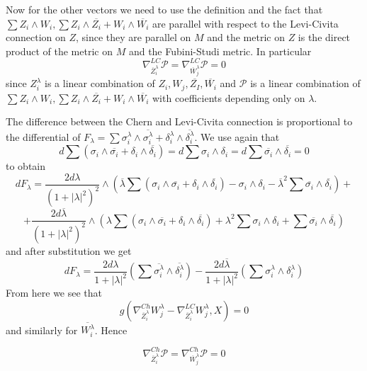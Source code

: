 \documentclass[11pt,oneside,leqno]{amsart}
\theoremstyle{plain}
\theoremstyle{definition}
\begin{document}
Now for the other vectors we need to use the definition and the fact that $\sum Z_i\wedge W_i, \sum Z_i\wedge \overline{Z_i}+W_i\wedge \overline{W_i}$ are parallel with respect to the Levi-Civita connection on $Z$, since they are parallel on $M$ and the metric on $Z$ is the direct product of the metric on $M$ and the Fubini-Studi metric. In particular
\begin{equation}
\nabla^{LC}_{\overline{Z}_i^{\lambda}} \mathcal{P} =\nabla^{LC}_{\overline{W}_j^{\lambda}} \mathcal{P} = 0
\end{equation}
since $Z_i^{\lambda}$ is a linear combination of $Z_i,W_j,\overline{Z_I},\overline{W_i}$ and $\mathcal{P}$ is a linear combination of $\sum Z_i\wedge W_i, \sum Z_i\wedge \overline{Z_i}+W_i\wedge \overline{W_i}$ with coefficients depending only on $\lambda$.

The difference between the Chern and Levi-Civita connection is proportional to the differential of $F_{\lambda} = \sum \sigma_i^{\lambda}\wedge\overline{\sigma_i^{\lambda}}+\delta_i^{\lambda}\wedge\overline{\delta_i^{\lambda}}$.
We use again that $$d\sum(\sigma_i\wedge\overline{\sigma_i}+\delta_i\wedge\overline{\delta_i}) = d\sum\sigma_i\wedge\delta_i = d \sum \overline{\sigma_i}\wedge\overline{\delta_i} = 0$$
to obtain
$$
dF_{\lambda} = \frac{2d\lambda}{(1+|\lambda|^2)^2}\wedge\left( \overline{\lambda}\sum(\sigma_i\wedge\overline{\sigma_i}+\delta_i\wedge\overline{\delta_i}) - \sigma_i\wedge\delta_i - \overline{\lambda}^2\sum \overline{\sigma_i}\wedge\overline{\delta_i}\right) +$$
$$
+\frac{2d\overline{\lambda}}{(1+|\lambda|^2)^2}\wedge\left(\lambda\sum(\sigma_i\wedge\overline{\sigma_i}+\delta_i\wedge\overline{\delta_i}) + {\lambda}^2\sum\sigma_i\wedge\delta_i +\sum \overline{\sigma_i}\wedge\overline{\delta_i}\right)
$$
and after substitution we get
\begin{equation}
dF_{\lambda} = \frac{2d\lambda}{1+|\lambda|^2}\left(\sum\overline{\sigma_i^{\lambda}}\wedge\overline{\delta_i^{\lambda}}\right)-\frac{2d\overline{\lambda}}{1+|\lambda|^2}
\left(\sum\sigma_i^{\lambda}\wedge\delta_i^{\lambda}\right)
\end{equation}
From here we see that
\begin{equation}
g(\nabla^{Ch}_{\overline{Z}_i^{\lambda}}W_j^{\lambda}-\nabla^{LC}_{\overline{Z}_i^{\lambda}}W_j^{\lambda}, X) = 0
\end{equation}
and similarly for $\overline{W_i^{\lambda}}$. Hence

\begin{equation}
\nabla^{Ch}_{\overline{Z}_i^{\lambda}} \mathcal{P} =\nabla^{Ch}_{\overline{W}_j^{\lambda}} \mathcal{P} = 0
\end{equation}
\end{document}
